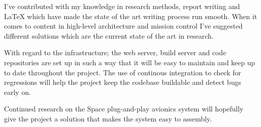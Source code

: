 I've contributed with my knowledge in research methods, report writing and LaTeX
which have made the state of the art writing process run smooth. When it comes to
content in high-level architecture and mission control I've suggested
different solutions which are the current state of the art in research.

With regard to the infrastructure; the web server, build server and code repositories
are set up in such a way that it will be easy to maintain and keep up to date
throughout the project. The use of continous integration to check for regressions
will help the project keep the codebase buildable and detect bugs early on.

Continued research on the Space plug-and-play avionics system will hopefully give
the project a solution that makes the system easy to assembly.
